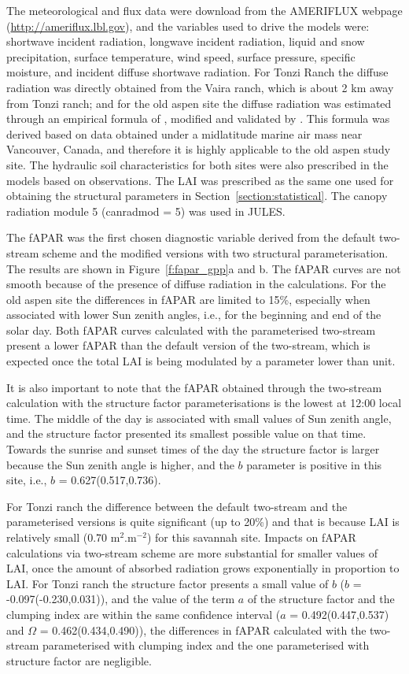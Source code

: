 \documentclass[a4paper,11pt]{report}
\begin{document}
The meteorological and flux data were download from the AMERIFLUX webpage (\url{http://ameriflux.lbl.gov}), and the variables used to drive the models were: shortwave incident radiation, longwave incident radiation, liquid and snow precipitation, surface temperature, wind speed, surface pressure, specific moisture, and incident diffuse shortwave radiation. For Tonzi Ranch the diffuse radiation was directly obtained from the Vaira ranch, which is about 2 km away from Tonzi ranch; and for the old aspen site the diffuse radiation was estimated through an empirical formula of \citet{Erbs1982}, modified and validated by \citet{Black1991}. This formula was derived based on data obtained under a midlatitude marine air mass near Vancouver, Canada, and therefore it is highly applicable to the old aspen study site. The hydraulic soil characteristics for both sites were also prescribed in the models based on observations. The LAI was prescribed as the same one used for obtaining the structural parameters in Section~\ref{section:statistical}. The canopy radiation module 5 (can\textunderscore rad\textunderscore mod = 5) was used in JULES.

The fAPAR was the first chosen diagnostic variable derived from the default two-stream scheme and the modified versions with two structural parameterisation. The results are shown in Figure~\ref{f:fapar_gpp}a and b. The fAPAR curves are not smooth because of the presence of diffuse radiation in the calculations. For the old aspen site the differences in fAPAR are limited to 15\%, especially when associated with lower Sun zenith angles, i.e., for the beginning and end of the solar day. Both fAPAR curves calculated with the parameterised two-stream present a lower fAPAR than the default version of the two-stream, which is expected once the total LAI is being modulated by a parameter lower than unit. 

It is also important to note that the fAPAR obtained through the two-stream calculation with the structure factor parameterisations is the lowest at 12:00 local time. The middle of the day is associated with small values of Sun zenith angle, and the structure factor presented its smallest possible value on that time. Towards the sunrise and sunset times of the day the structure factor is larger because the Sun zenith angle is higher, and the $b$ parameter is positive in this site, i.e., $b$ = 0.627(0.517,0.736).

For Tonzi ranch the difference between the default two-stream and the parameterised versions is quite significant (up to 20\%) and that is because LAI is relatively small (0.70 m$^2$.m$^{-2}$) for this savannah site. Impacts on fAPAR calculations via two-stream scheme are more substantial for smaller values of LAI, once the amount of absorbed radiation grows exponentially in proportion to LAI. For Tonzi ranch the structure factor presents a small value of $b$ ($b$ = -0.097(-0.230,0.031)), and the value of the term $a$ of the structure factor and the clumping index are within the same confidence interval ($a$ = 0.492(0.447,0.537) and $\Omega$ = 0.462(0.434,0.490)), the differences in fAPAR calculated with the two-stream parameterised with clumping index and the one parameterised with structure factor are negligible.
\end{document}
